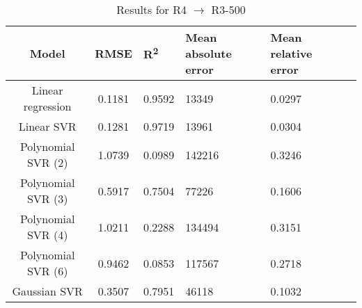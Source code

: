 \begin{table}[H]
\centering
\begin{adjustbox}{center}
\begin{tabular}{c | c M{1.2cm} M{2.5cm} M{2.5cm} M{1.8cm}}
Model & RMSE & R\textsuperscript{2} & Mean absolute error & Mean relative error \tabularnewline
\hline
Linear regression & 0.1181 & 0.9592 &  13349 & 0.0297 \\
Linear SVR & 0.1281 & 0.9719 &  13961 & 0.0304 \\
Polynomial SVR (2) & 1.0739 & 0.0989 & 142216 & 0.3246 \\
Polynomial SVR (3) & 0.5917 & 0.7504 &  77226 & 0.1606 \\
Polynomial SVR (4) & 1.0211 & 0.2288 & 134494 & 0.3151 \\
Polynomial SVR (6) & 0.9462 & 0.0853 & 117567 & 0.2718 \\
Gaussian SVR & 0.3507 & 0.7951 &  46118 & 0.1032 \\
\end{tabular}
\end{adjustbox}
\\
\caption{Results for R4 $\rightarrow$ R3-500}
\label{tab:coreonly_linear_R4_R3_500}
\end{table}
